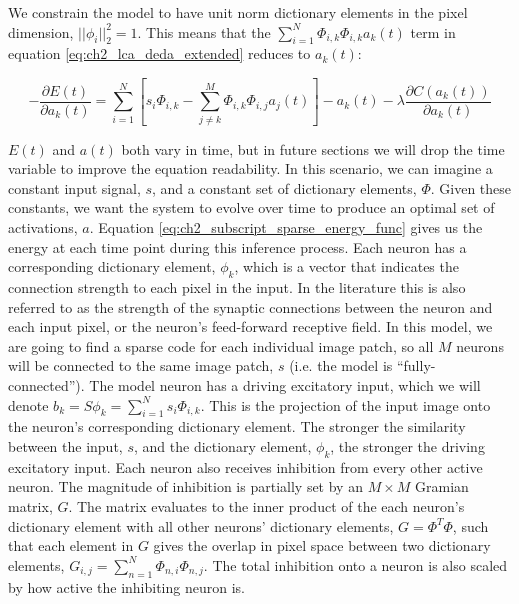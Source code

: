 We constrain the model to have unit norm dictionary elements in the pixel dimension, $||\phi_{i}||_2^2 = 1$. This means that the $\sum_{i=1}^{N}\Phi_{i,k}\Phi_{i,k}a_{k}(t)$ term in equation \eqref{eq:ch2_lca_deda_extended} reduces to $a_k(t)$:

\begin{equation}\label{eq:ch2_lca_deda}
    -\frac{\partial E(t)}{\partial a_{k}(t)} =
    \sum\limits_{i=1}^{N} \left[ s_{i} \Phi_{i,k} -
    \sum\limits_{j \neq k}^{M} \Phi_{i,k} \Phi_{i,j} a_{j}(t) \right] - a_{k}(t) -
    \lambda \frac{\partial C(a_{k}(t))}{\partial a_{k}(t)}
\end{equation}

$E(t)$ and $a(t)$ both vary in time, but in future sections we will drop the time variable to improve the equation readability. In this scenario, we can imagine a constant input signal, $s$, and a constant set of dictionary elements, $\Phi$. Given these constants, we want the system to evolve over time to produce an optimal set of activations, $a$. Equation \eqref{eq:ch2_subscript_sparse_energy_func} gives us the energy at each time point during this inference process. Each neuron has a corresponding dictionary element, $\phi_{k}$, which is a vector that indicates the connection strength to each pixel in the input. In the literature this is also referred to as the strength of the synaptic connections between the neuron and each input pixel, or the neuron's feed-forward receptive field. In this model, we are going to find a sparse code for each individual image patch, so all $M$ neurons will be connected to the same image patch, $s$ (i.e. the model is ``fully-connected''). The model neuron has a driving excitatory input, which we will denote $b_{k} = S\phi_{k} = \sum_{i=1}^{N}s_{i} \Phi_{i,k}$. This is the projection of the input image onto the neuron's corresponding dictionary element. The stronger the similarity between the input, $s$, and the dictionary element, $\phi_{k}$, the stronger the driving excitatory input. Each neuron also receives inhibition from every other active neuron. The magnitude of inhibition is partially set by an $M \times M$ Gramian matrix, $G$. The matrix evaluates to the inner product of the each neuron's dictionary element with all other neurons' dictionary elements, $G = \Phi^T\Phi$, such that each element in $G$ gives the overlap in pixel space between two dictionary elements, $G_{i,j} = \sum\limits_{n=1}^{N} \Phi_{n,i}\Phi_{n,j}$. The total inhibition onto a neuron is also scaled by how active the inhibiting neuron is.

